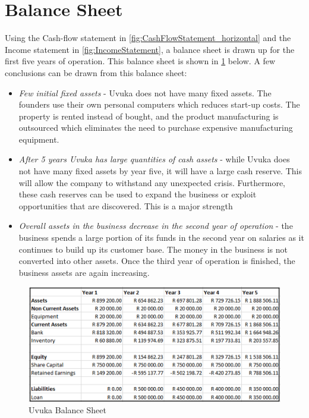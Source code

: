 \pagebreak
\section{Balance Sheet}

Using the Cash-flow statement in \cref{fig:CashFlowStatement_horizontal} and the Income statement in \cref{fig:IncomeStatement}, a balance sheet is drawn up for the first five years of operation. This balance sheet is shown in \cref{fig:BalanceSheet} below. A few conclusions can be drawn from this balance sheet:
\begin{itemize}
	\item \textit{Few initial fixed assets} - Uvuka does not have many fixed assets. The founders use their own personal computers which reduces start-up costs. The property is rented instead of bought, and the product manufacturing is outsourced which eliminates the need to purchase expensive manufacturing equipment.  
    \item \textit{After 5 years Uvuka has large quantities of cash assets} - while Uvuka does not have many fixed assets by year five, it will have a large cash reserve. This will allow the company to withstand any unexpected crisis. Furthermore, these cash reserves can be used to expand the business or exploit opportunities that are discovered. This is a major strength
    \item \textit{Overall assets in the business decrease in the second year of operation} - the business spends a large portion of its funds in the second year on salaries as it continues to build up its customer base. The money in the business is not converted into other assets. Once the third year of operation is finished, the business assets are again increasing.
    
\end{itemize}

\begin{figure}[H]
    \centering
    \includegraphics[width=1\textwidth]{images/BalanceSheet}
    \vskip10pt
    \caption[Uvuka Balance Sheet]{Uvuka Balance Sheet}
    \label{fig:BalanceSheet}
\end{figure}


